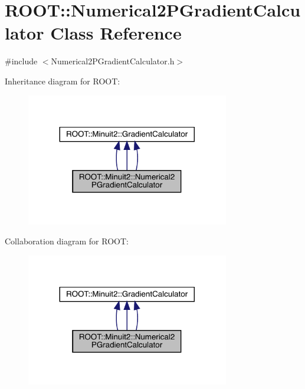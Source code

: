 \hypertarget{classROOT_1_1Minuit2_1_1Numerical2PGradientCalculator}{}\section{R\+O\+OT\+:\+:Numerical2\+P\+Gradient\+Calculator Class Reference}
\label{classROOT_1_1Minuit2_1_1Numerical2PGradientCalculator}


{\ttfamily \#include $<$Numerical2\+P\+Gradient\+Calculator.\+h$>$}



Inheritance diagram for R\+O\+OT\+:
\nopagebreak
\begin{figure}[H]
\begin{center}
\leavevmode
\includegraphics[width=251pt]{d7/df9/classROOT_1_1Minuit2_1_1Numerical2PGradientCalculator__inherit__graph}
\end{center}
\end{figure}


Collaboration diagram for R\+O\+OT\+:
\nopagebreak
\begin{figure}[H]
\begin{center}
\leavevmode
\includegraphics[width=251pt]{d5/def/classROOT_1_1Minuit2_1_1Numerical2PGradientCalculator__coll__graph}
\end{center}
\end{figure}
